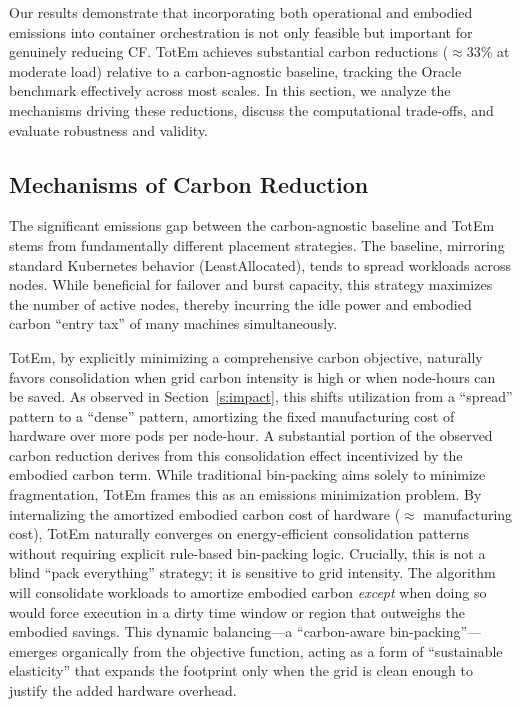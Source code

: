 \documentclass[10pt,journal,compsoc]{IEEEtran}
\begin{document}
Our results demonstrate that incorporating both operational and embodied emissions into container orchestration is not only feasible but important for genuinely reducing CF. TotEm achieves substantial carbon reductions ($\approx$33\% at moderate load) relative to a carbon-agnostic baseline, tracking the Oracle benchmark effectively across most scales. In this section, we analyze the mechanisms driving these reductions, discuss the computational trade-offs, and evaluate robustness and validity.

\subsection{Mechanisms of Carbon Reduction}
The significant emissions gap between the carbon-agnostic baseline and TotEm stems from fundamentally different placement strategies. The baseline, mirroring standard Kubernetes behavior (LeastAllocated), tends to spread workloads across nodes. While beneficial for failover and burst capacity, this strategy maximizes the number of active nodes, thereby incurring the idle power and embodied carbon ``entry tax'' of many machines simultaneously. 

TotEm, by explicitly minimizing a comprehensive carbon objective, naturally favors consolidation when grid carbon intensity is high or when node-hours can be saved. As observed in Section~\ref{s:impact}, this shifts utilization from a ``spread'' pattern to a ``dense'' pattern, amortizing the fixed manufacturing cost of hardware over more pods per node-hour. A substantial portion of the observed carbon reduction derives from this consolidation effect incentivized by the embodied carbon term. While traditional bin-packing aims solely to minimize fragmentation, TotEm frames this as an emissions minimization problem. By internalizing the amortized embodied carbon cost of hardware ($\approx$ manufacturing cost), TotEm naturally converges on energy-efficient consolidation patterns without requiring explicit rule-based bin-packing logic. Crucially, this is not a blind ``pack everything'' strategy; it is sensitive to grid intensity. The algorithm will consolidate workloads to amortize embodied carbon \emph{except} when doing so would force execution in a dirty time window or region that outweighs the embodied savings. This dynamic balancing---a ``carbon-aware bin-packing''---emerges organically from the objective function, acting as a form of ``sustainable elasticity'' that expands the footprint only when the grid is clean enough to justify the added hardware overhead.
\end{document}
